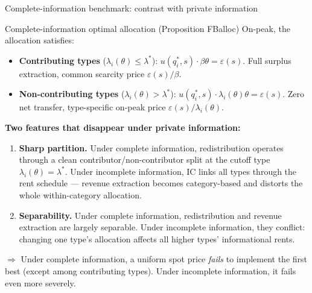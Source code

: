 \documentclass[10pt, aspectratio=169]{beamer}
\begin{document}
\begin{frame}{Complete-information benchmark: contrast with private information}
\begin{block}{Complete-information optimal allocation (Proposition FBalloc)}
On-peak, the allocation satisfies:
\begin{itemize}
\item \textbf{Contributing types} ($\lambda_i(\theta) \leq \lambda^\ast$): $u(q_i^\ast,s)\cdot\beta\theta = \varepsilon(s)$. Full surplus extraction, common scarcity price $\varepsilon(s)/\beta$.
\item \textbf{Non-contributing types} ($\lambda_i(\theta) > \lambda^\ast$): $u(q_i^\ast,s)\cdot\lambda_i(\theta)\theta = \varepsilon(s)$. Zero net transfer, type-specific on-peak price $\varepsilon(s)/\lambda_i(\theta)$.
\end{itemize}
\end{block}
\vspace{0.2cm}
\textbf{Two features that disappear under private information:}
\begin{enumerate}
\item \textbf{Sharp partition.} Under complete information, redistribution operates through a clean contributor/non-contributor split at the cutoff type $\lambda_i(\theta) = \lambda^\ast$. Under incomplete information, IC links all types through the rent schedule — revenue extraction becomes category-based and distorts the whole within-category allocation.
\item \textbf{Separability.} Under complete information, redistribution and revenue extraction are largely separable. Under incomplete information, they conflict: changing one type's allocation affects all higher types' informational rents.
\end{enumerate}
\vspace{0.1cm}
$\Rightarrow$ Under complete information, a uniform spot price \emph{fails} to implement the first best (except among contributing types). Under incomplete information, it fails even more severely.
\end{frame}
\end{document}
